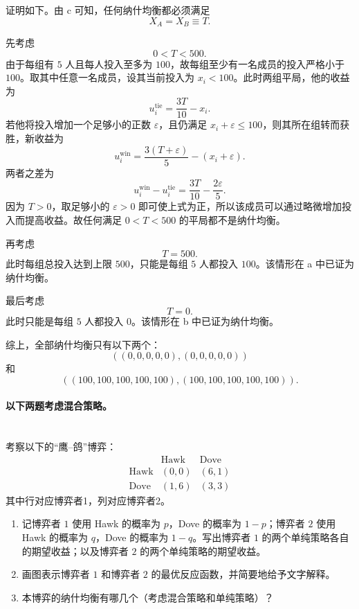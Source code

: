 \documentclass[12pt,a4paper]{article}
\begin{document}
\begin{enumerate}[label=\alph*.]
  证明如下。由 c 可知，任何纳什均衡都必须满足
  \[
    X_A=X_B\equiv T.
  \]

  先考虑
  \[
    0<T<500.
  \]
  由于每组有 \(5\) 人且每人投入至多为 \(100\)，故每组至少有一名成员的投入严格小于 \(100\)。取其中任意一名成员，设其当前投入为 \(x_i<100\)。此时两组平局，他的收益为
  \[
    u_i^{\mathrm{tie}}=\frac{3T}{10}-x_i.
  \]
  若他将投入增加一个足够小的正数 \(\varepsilon\)，且仍满足 \(x_i+\varepsilon\le 100\)，则其所在组转而获胜，新收益为
  \[
    u_i^{\mathrm{win}}
    =\frac{3(T+\varepsilon)}{5}-(x_i+\varepsilon).
  \]
  两者之差为
  \[
    u_i^{\mathrm{win}}-u_i^{\mathrm{tie}}
    =\frac{3T}{10}-\frac{2\varepsilon}{5}.
  \]
  因为 \(T>0\)，取足够小的 \(\varepsilon>0\) 即可使上式为正，所以该成员可以通过略微增加投入而提高收益。故任何满足 \(0<T<500\) 的平局都不是纳什均衡。

  再考虑
  \[
    T=500.
  \]
  此时每组总投入达到上限 \(500\)，只能是每组 \(5\) 人都投入 \(100\)。该情形在 a 中已证为纳什均衡。

  最后考虑
  \[
    T=0.
  \]
  此时只能是每组 \(5\) 人都投入 \(0\)。该情形在 b 中已证为纳什均衡。

  综上，全部纳什均衡只有以下两个：
  \[
    ((0,0,0,0,0),(0,0,0,0,0))
  \]
  和
  \[
    ((100,100,100,100,100),(100,100,100,100,100)).
  \]

\end{enumerate}

\vspace{0.5cm}
\paragraph{以下两题考虑混合策略。}

\section{}
考察以下的“鹰--鸽”博弈：
\[
\begin{array}{c|cc}
    & \text{Hawk} & \text{Dove} \\
  \hline
  \text{Hawk} & (0,0) & (6,1) \\
  \text{Dove} & (1,6) & (3,3)
\end{array}
\]
其中行对应博弈者1，列对应博弈者2。

\begin{enumerate}[label=\alph*.]
  \item 记博弈者 \(1\) 使用 Hawk 的概率为 \(p\)，Dove 的概率为 \(1-p\)；博弈者 \(2\) 使用 Hawk 的概率为 \(q\)，Dove 的概率为 \(1-q\)。写出博弈者 \(1\) 的两个单纯策略各自的期望收益；以及博弈者 \(2\) 的两个单纯策略的期望收益。
  \item 画图表示博弈者 \(1\) 和博弈者 \(2\) 的最优反应函数，并简要地给予文字解释。
  \item 本博弈的纳什均衡有哪几个（考虑混合策略和单纯策略）？
\end{enumerate}
\end{document}
